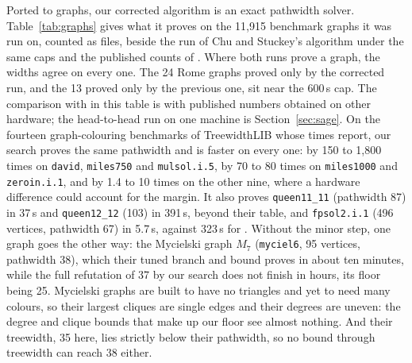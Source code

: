 Ported to graphs, our corrected algorithm is an exact pathwidth solver. Table~\ref{tab:graphs} gives what it proves on the 11,915 benchmark graphs it was run on, counted as files, beside the run of Chu and Stuckey's
algorithm under the same caps and the published counts of
\citet{CoudertMazauricNisse2016}. Where both runs prove a graph, the widths
agree on every one. The 24 Rome graphs proved only by the corrected run, and the
13 proved only by the previous one, sit near the 600\,s cap. The comparison with
\citet{CoudertMazauricNisse2016} in this table is with published numbers obtained on other
hardware; the head-to-head run on one machine is Section~\ref{sec:sage}. On the fourteen graph-colouring benchmarks of TreewidthLIB whose times
\citet[Table~4]{CoudertMazauricNisse2016} report, our search proves the same
pathwidth and is faster on every one: by 150 to 1,800 times on \texttt{david},
\texttt{miles750} and \texttt{mulsol.i.5}, by 70 to 80 times on
\texttt{miles1000} and \texttt{zeroin.i.1}, and by 1.4 to 10 times on the
other nine, where a hardware difference could account for the margin. It also
proves \texttt{queen11\_11} (pathwidth 87) in 37\,s and \texttt{queen12\_12}
(103) in 391\,s, beyond their table, and \texttt{fpsol2.i.1} (496 vertices,
pathwidth 67) in 5.7\,s, against 323\,s for
\citet{KobayashiKomuroTamaki2014}. Without the minor step, one graph goes the other way: the Mycielski graph
$M_7$ (\texttt{myciel6}, 95 vertices, pathwidth 38), which their tuned branch
and bound proves in about ten minutes, while the full refutation of 37 by our
search does not finish in hours, its floor being 25. Mycielski graphs are
built to have no triangles and yet to need many colours, so their largest
cliques are single edges and their degrees are uneven: the degree and clique
bounds that make up our floor see almost nothing. And their treewidth, 35 here, lies strictly below their pathwidth, so no
bound through treewidth can reach 38 either.

